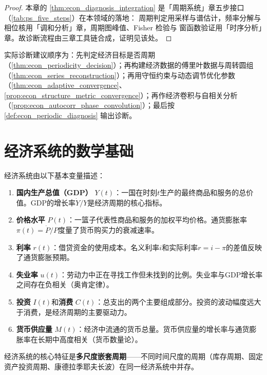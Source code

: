 \begin{proof}
本章的 \cref{thm:econ_diagnosis_integration} 是「周期系统」章五步接口（\cref{tab:ps_five_steps}）在本领域的落地：
周期判定用采样与谱估计，频率分解与相位核用「调和分析」章，周期图峰值、Fisher 检验与
窗函数验证用「时序分析」章。故诊断流程由三章工具链合成，证明见该处。
\end{proof}

\begin{remark}[整合后的操作顺序]\label{rem:econ_integration_order}
实际诊断建议顺序为：先判定经济目标是否周期（\cref{thm:econ_periodicity_decision}）；再构建经济数据的傅里叶数据与周转圆组（\cref{thm:econ_series_reconstruction}）；再用守恒约束与动态调节优化参数（\cref{thm:econ_adaptive_convergence}、\cref{prop:econ_structure_metric_convergence}）；再作经济卷积与自相关分析（\cref{prop:econ_autocorr_phase_convolution}）；最后按 \cref{def:econ_periodic_diagnosis} 输出诊断。
\end{remark}

\section{经济系统的数学基础}

\begin{definition}[经济系统的基本量]\label{def:economic_quantities}
经济系统由以下基本变量描述：
\begin{enumerate}[label=(\roman*)]
    \item \textbf{国内生产总值（GDP）} $Y(t)$：一国在时刻$t$生产的最终商品和服务的总价值。GDP的增长率$\dot{Y}/Y$是经济周期的核心指标。
    \item \textbf{价格水平} $P(t)$：一篮子代表性商品和服务的加权平均价格。通货膨胀率$\pi(t) = \dot{P}/P$度量了货币购买力的衰减速率。
    \item \textbf{利率} $r(t)$：借贷资金的使用成本。名义利率$i$和实际利率$r = i - \pi$的差值反映了通货膨胀预期。
    \item \textbf{失业率} $u(t)$：劳动力中正在寻找工作但未找到的比例。失业率与GDP增长率之间存在负相关（奥肯定律）。
    \item \textbf{投资} $I(t)$和\textbf{消费} $C(t)$：总支出的两个主要组成部分。投资的波动幅度远大于消费，是经济周期的主要驱动力。
    \item \textbf{货币供应量} $M(t)$：经济中流通的货币总量。货币供应量的增长率与通货膨胀率在长期中高度相关（货币数量论）。
\end{enumerate}
经济系统的核心特征是\textbf{多尺度嵌套周期}——不同时间尺度的周期（库存周期、固定资产投资周期、康德拉季耶夫长波）在同一经济系统中并存。
\end{definition}

